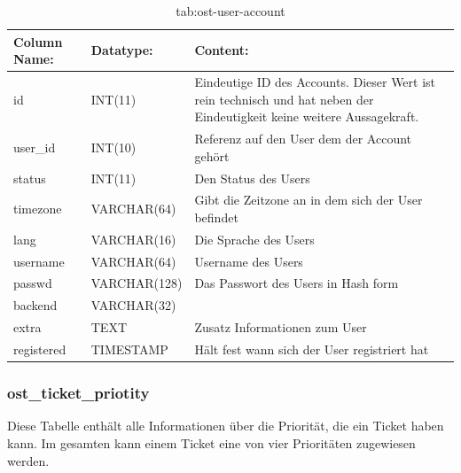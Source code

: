 \begin{table}[h]
	\begin{tabular}{|p{3.5cm}|p{4cm}|p{6.2cm}|}
		\hline
		\textbf{Column Name:} & \textbf{Datatype:} & \textbf{Content:}\\
		\hline
		id & INT(11) & Eindeutige ID des Accounts. Dieser Wert ist rein technisch und hat  neben der Eindeutigkeit keine weitere 
		Aussagekraft.\\
		\hline
		user\_id & INT(10) & Referenz auf den User dem der Account gehört\\
		\hline
		status& INT(11) & Den Status des Users \\
		\hline
		timezone & VARCHAR(64) & Gibt die Zeitzone an in dem sich der User befindet\\
		\hline
		lang & VARCHAR(16) & Die Sprache des Users\\
		\hline
		username & VARCHAR(64) & Username des Users\\
		\hline
		passwd & VARCHAR(128) & Das Passwort des Users in Hash form\\
		\hline
		backend & VARCHAR(32) &\\
		\hline
		extra & TEXT & Zusatz Informationen zum User\\
		\hline
		registered & TIMESTAMP & Hält fest wann sich der User registriert hat\\
		\hline
		
	\end{tabular}
	\caption{tab:ost-user-account}
\end{table}
\label{tab:ost_user_account}

\newpage

\subsubsection{ost\_ticket\_priotity}

Diese Tabelle enthält alle Informationen über die Priorität, die ein Ticket haben kann.
Im gesamten kann einem Ticket eine von vier Prioritäten zugewiesen werden.

